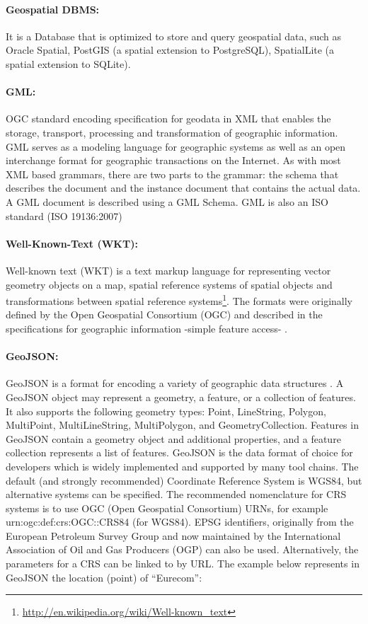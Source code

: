 \paragraph{Geospatial DBMS:}
 It is a Database that is optimized to store and query geospatial data, such as Oracle Spatial, PostGIS (a spatial extension to PostgreSQL), SpatialLite (a spatial extension to SQLite). 
 
 \paragraph{GML:}
 OGC standard encoding specification for geodata in XML that enables the storage, transport, processing and transformation of geographic information. GML serves as a modeling language for geographic systems as well as an open interchange format for geographic transactions on the Internet. As with most XML based grammars, there are two parts to the grammar: the schema that describes the document and the instance document that contains the actual data. A GML document is described using a GML Schema. GML is also an ISO standard (ISO 19136:2007) 
 
 \paragraph{Well-Known-Text (WKT):}
 Well-known text (WKT) is a text markup language for representing vector geometry objects on a map, spatial reference systems of spatial objects and transformations between spatial reference systems\footnote{\url{http://en.wikipedia.org/wiki/Well-known_text}}. The formats were originally defined by the Open Geospatial Consortium (OGC) and described in the specifications for geographic information -simple feature access- \cite{opengis2011}. 
 
 \paragraph{GeoJSON:}
 
GeoJSON is a format for encoding a variety of geographic data structures \cite{geojson}. A GeoJSON object may represent a geometry, a feature, or a collection of features. It also supports the following geometry types: Point, LineString, Polygon, MultiPoint, MultiLineString, MultiPolygon, and GeometryCollection. Features in GeoJSON contain a geometry object and additional properties, and a feature collection represents a list of features. GeoJSON is the data format of choice for developers which is widely implemented and supported by many tool chains.
The default (and strongly recommended) Coordinate Reference System is WGS84, but alternative systems can be specified. The recommended nomenclature for CRS systems is to use OGC (Open Geospatial Consortium) URNs, for example urn:ogc:def:crs:OGC::CRS84 (for WGS84). EPSG identifiers, originally from the European Petroleum Survey Group and now maintained by the International Association of Oil and Gas Producers (OGP) can also be used. Alternatively, the parameters for a CRS can be linked to by URL. 
The example below represents in GeoJSON the location (point) of ``Eurecom'':

